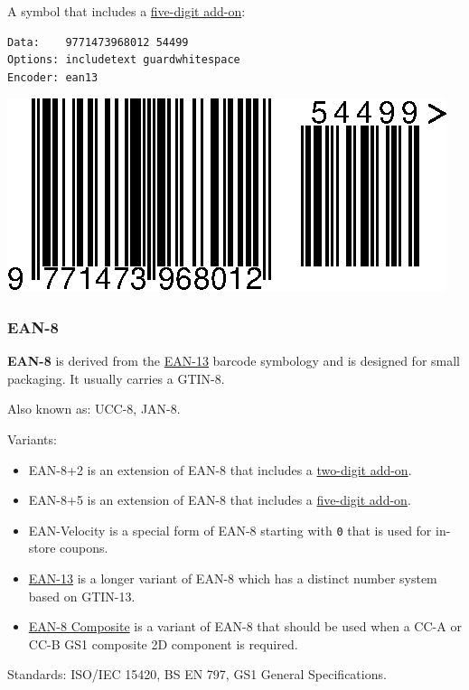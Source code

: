 A symbol that includes a \protect\hyperlink{ean-5}{five-digit add-on}:

\begin{verbatim}
Data:    9771473968012 54499
Options: includetext guardwhitespace
Encoder: ean13
\end{verbatim}

\includegraphics{images/ean13-2.eps}

\hypertarget{ean-8}{%
\subsubsection{EAN-8}\label{ean-8}}

\textbf{EAN-8} is derived from the \protect\hyperlink{ean-13}{EAN-13}
barcode symbology and is designed for small packaging. It usually
carries a GTIN-8.

Also known as: UCC-8, JAN-8.

Variants:

\begin{itemize}
\tightlist
\item
  EAN-8+2 is an extension of EAN-8 that includes a
  \protect\hyperlink{ean-2}{two-digit add-on}.
\item
  EAN-8+5 is an extension of EAN-8 that includes a
  \protect\hyperlink{ean-5}{five-digit add-on}.
\item
  EAN-Velocity is a special form of EAN-8 starting with \texttt{0} that
  is used for in-store coupons.
\item
  \protect\hyperlink{ean-13}{EAN-13} is a longer variant of EAN-8 which
  has a distinct number system based on GTIN-13.
\item
  \protect\hyperlink{gs1-composite-symbols}{EAN-8 Composite} is a
  variant of EAN-8 that should be used when a CC-A or CC-B GS1 composite
  2D component is required.
\end{itemize}

Standards: ISO/IEC 15420, BS EN 797, GS1 General Specifications.

